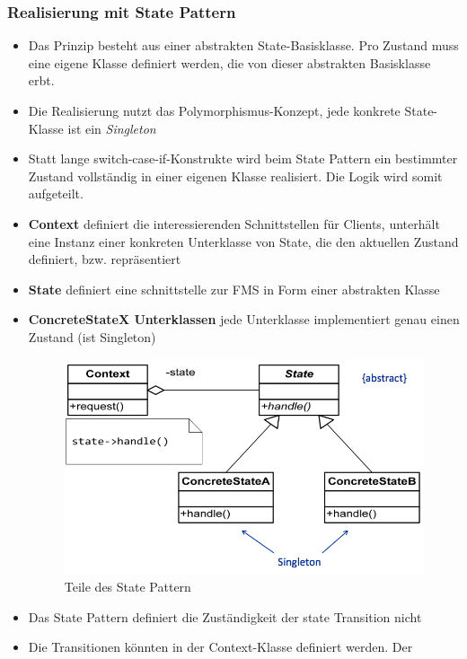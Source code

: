 \subsubsection{Realisierung mit State Pattern}
\begin{itemize}
  \item Das Prinzip besteht aus einer abstrakten State-Basisklasse. Pro Zustand
  muss eine eigene Klasse definiert werden, die von dieser abstrakten
  Basisklasse erbt.
  \item Die Realisierung nutzt das Polymorphismus-Konzept, jede konkrete
  State-Klasse ist ein \textit{Singleton}
  \item Statt lange switch-case-if-Konstrukte wird beim State Pattern ein
  bestimmter Zustand vollständig in einer eigenen Klasse realisiert. Die Logik
  wird somit aufgeteilt.
  \item \textbf{Context} definiert die interessierenden Schnittstellen für
  Clients, unterhält eine Instanz einer konkreten Unterklasse von State, die den
  aktuellen Zustand definiert, bzw. repräsentiert
  \item \textbf{State} definiert eine schnittstelle zur FMS in Form einer
  abstrakten Klasse
  \item \textbf{ConcreteStateX Unterklassen} jede Unterklasse implementiert
  genau einen Zustand (ist Singleton)
 \begin{figure}[h]
  \centering
  {\includegraphics[scale = 0.3]{images/FSM/state_pattern}  
  \caption{Teile des State Pattern}
  \label{fig:state_pattern}}
\end{figure}
\item Das State Pattern definiert die Zuständigkeit der state Transition nicht
\item Die Transitionen könnten in der Context-Klasse definiert werden. Der

\end{itemize}
